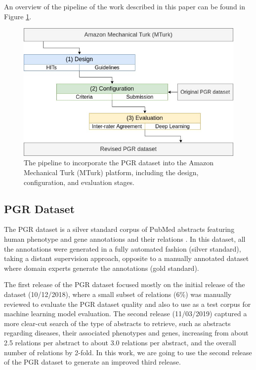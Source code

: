 An overview of the pipeline of the work described in this paper can be found in Figure \ref{fig61}.

\begin{figure}
\centering
\includegraphics[width=0.8\linewidth]{images/chapter_6/figure_1.jpg}
\caption[Pipeline to Incorporate the PGR Dataset into MTurk]{The pipeline to incorporate the PGR dataset into the Amazon Mechanical Turk (MTurk) platform, including the design, configuration, and evaluation stages.} \label{fig61}
\end{figure}

\subsection{PGR Dataset}

The PGR dataset is a silver standard corpus of PubMed abstracts featuring human phenotype and gene annotations and their relations \citep{sousa2019silver}. In this dataset, all the annotations were generated in a fully automated fashion (silver standard), taking a distant supervision approach, opposite to a manually annotated dataset where domain experts generate the annotations (gold standard). 

The first release of the  PGR dataset focused mostly on the initial release of the dataset (10/12/2018), where a small subset of relations (6\%) was manually reviewed to evaluate the PGR dataset quality and also to use as a test corpus for machine learning model evaluation. The second release (11/03/2019) captured a more clear-cut search of the type of abstracts to retrieve, such as abstracts regarding diseases, their associated phenotypes and genes, increasing from about 2.5 relations per abstract to about 3.0 relations per abstract, and the overall number of relations by 2-fold. In this work, we are going to use the second release of the PGR dataset to generate an improved third release. 

